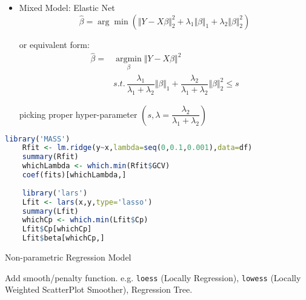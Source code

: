 \begin{itemize}[topsep=2pt,itemsep=2pt]
{then for $ \lambda >0 $, we can get a positive-definite matrix $ X'X+\lambda I $
}
\begin{equation}
    \hat{\beta }^\mathrm{Ridge}_\lambda  =(X'X+\lambda I)^{-1}X'Y
\end{equation}

A Bayesian point of view for Ridge regreession see \autoref{SubSubSectionBayesianLinearModel}



\item Mixed Model: Elastic Net
\begin{equation}
    \hat{\beta }=\arg\min (\Vert Y-X\beta \Vert _2 ^2+\lambda _1\Vert \beta  \Vert _1+\lambda_2\Vert \beta \Vert _2^2)
\end{equation}

or equivalent form:
\begin{align}
    \hat{\beta }=&\mathop{\arg\min}\limits_{\beta}\Vert Y-X\beta  \Vert ^2\\
    &s.t. \, \dfrac{\lambda _1}{\lambda _1+\lambda _2}\Vert \beta  \Vert_1+\dfrac{\lambda _2}{\lambda _1+\lambda _2}\Vert \beta  \Vert _2^2\leq s 
\end{align}

picking proper hyper-parameter $ (s,\lambda =\dfrac{\lambda _2}{\lambda _1+\lambda _2}) $

\end{itemize}

\begin{rcode}
    \begin{lstlisting}[language=R]
    library('MASS')
    Rfit <- lm.ridge(y~x,lambda=seq(0,0.1,0.001),data=df)
    summary(Rfit)
    whichLambda <- which.min(Rfit$GCV)
    coef(fits)[whichLambda,]
    
    library('lars')
    Lfit <- lars(x,y,type='lasso')
    summary(Lfit)
    whichCp <- which.min(Lfit$Cp)
    Lfit$Cp[whichCp]
    Lfit$beta[whichCp,]
    \end{lstlisting}
    \end{rcode}

    
\begin{point}
    Non-parametric Regression Model
\end{point}
    
    Add smooth/penalty function. e.g. \lstinline|loess| (Locally Regression), \lstinline|lowess| (Locally Weighted ScatterPlot Smoother), Regression Tree.

